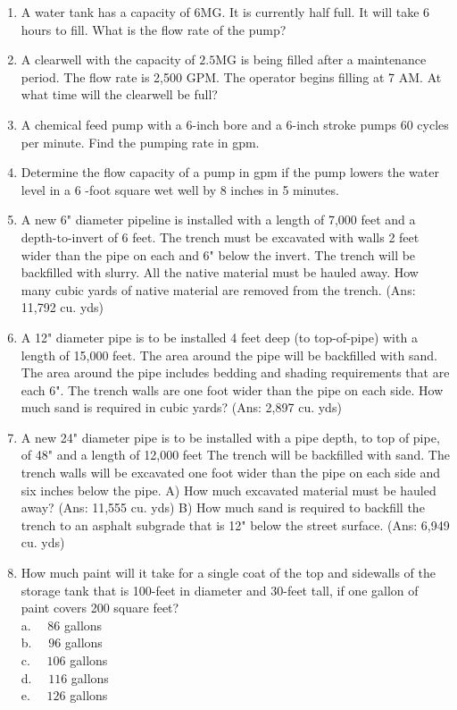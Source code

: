 \begin{enumerate}
\item  A water tank has a capacity of 6MG. It is currently half full. It will take 6 hours to fill. What is the flow rate of the pump?\\


\item  A clearwell with the capacity of $2.5 \mathrm{MG}$ is being filled after a maintenance period. The flow rate is 2,500 GPM. The operator begins filling at 7 AM. At what time will the clearwell be full?\\

  \item A chemical feed pump with a 6-inch bore and a 6-inch stroke pumps 60 cycles per minute. Find the pumping rate in gpm.
  
  \item Determine the flow capacity of a pump in gpm if the pump lowers the water level in a 6 -foot square wet well by 8 inches in 5 minutes.
  
  \item A new 6" diameter pipeline is installed with a length of 7,000 feet and a depth-to-invert of 6 feet. The trench must be excavated with walls 2 feet wider than the pipe on each and 6" below the invert.  The trench will be backfilled with slurry. All the native material must be hauled away. How many cubic yards of native material are removed from the trench.  (Ans: 11,792 cu. yds)
  
\item A 12" diameter pipe is to be installed 4 feet deep (to top-of-pipe) with a length of 15,000 feet. The area around the pipe will be backfilled with sand. The area around the pipe includes bedding and shading requirements that are each 6". The trench walls are one foot wider than the pipe on each side. How much sand is required in cubic yards? (Ans: 2,897 cu. yds)

\item A new 24" diameter pipe is to be installed with a pipe depth, to top of pipe, of 48" and a length of 12,000 feet
The trench will be backfilled with sand. The trench walls will be excavated one foot wider than the pipe on each side and six inches below the pipe.  A) How much excavated material must be hauled away?  (Ans: 11,555 cu. yds) B) How much sand is required to backfill the trench to an asphalt subgrade that is 12" below the street surface. (Ans: 6,949 cu. yds)

\item How much paint will it take for a single coat of the top and sidewalls of the storage tank that is 100-feet in diameter and 30-feet tall, if one gallon of paint covers 200 square feet?\\
a. $\quad 86$ gallons\\
b. $\quad 96$ gallons\\
c. $\quad 106$ gallons\\
d. $\quad 116$ gallons\\
e. $\quad 126$ gallons


\end{enumerate}
